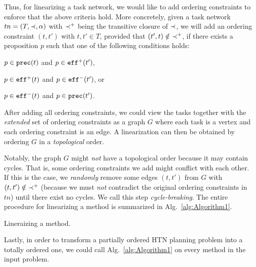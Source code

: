 Thus, for linearizing a task network, we would like to add ordering constraints to enforce that the above criteria hold. More concretely, given a task network $tn = (T, \mathord{\prec}{}, \alpha)$ with $\mathord{\prec}{}^{+}$ being the transitive closure of $\mathord{\prec}{}$, we will add an ordering constraint $(t, t')$ with $t, t' \in T$, provided that $(t' ,t ) \notin \mathord{\prec}{}^{+}$, if there exists a proposition $p$ such that one of the following conditions holds:
\begin{inparaenum}[1)]
    \item $p \in \mathtt{prec}(t)$ and $p \in \mathtt{eff}^{+}(t')$,
    \item $p \in \mathtt{eff}^{+}(t)$ and $p \in \mathtt{eff}^{-}(t')$, or
    \item $p \in \mathtt{eff}^{-}(t)$ and $p \in \mathtt{prec}(t')$. 
\end{inparaenum}
After adding all ordering constraints, we could view the tasks together with the \emph{extended} set of ordering constraints as a graph $G$ where each task is a vertex and each ordering constraint is an edge. A linearization can then be obtained by ordering $G$ in a \emph{topological} order.

Notably, the graph $G$ might \emph{not} have a topological order because it may contain cycles. That is, some ordering constraints we add might conflict with each other. If this is the case, we \emph{randomly} remove some edges $(t, t')$ from $G$ with $(t, t') \notin \mathord{\prec}{}^{+}$ (because we must \emph{not} contradict the original ordering constraints in $tn$) until there exist no cycles. We call this step \emph{cycle-breaking}. The entire procedure for linearizing a method is summarized in Alg.~\ref{alg:Algorithm1}.

\begin{algorithm}[t]
	
	\caption{Lineraizing a method.}
	\label{alg:Algorithm1}
\end{algorithm}

Lastly, in order to transform a partially ordered HTN planning problem into a totally ordered one, we could call Alg.~\ref{alg:Algorithm1} on every method in the input problem.




